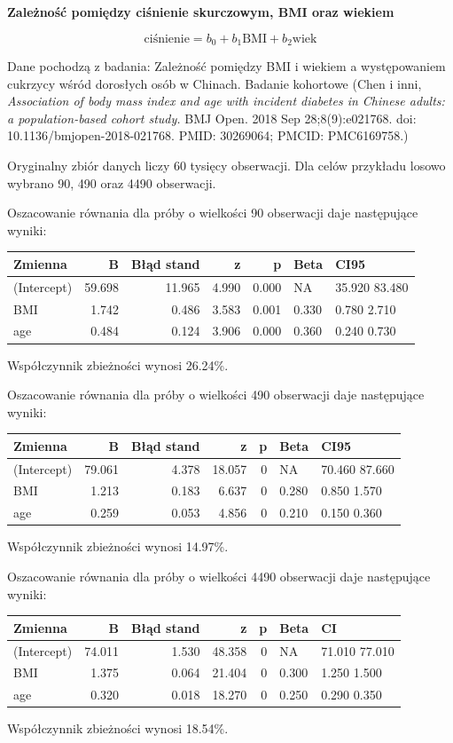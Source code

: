 \documentclass[
  openany]{book}
\begin{document}
\begin{example}
\textbf{Zależność pomiędzy ciśnienie skurczowym, BMI oraz wiekiem}

\[\textrm{ciśnienie} = b_0 + b_1 \textrm{BMI} + b_2\textrm{wiek}\]

Dane pochodzą z badania: Zależność pomiędzy BMI i wiekiem a występowaniem cukrzycy
wśród dorosłych osób w Chinach. Badanie kohortowe (Chen i inni, \emph{Association of body mass index
and age with incident diabetes in Chinese adults: a population-based cohort study.}
BMJ Open. 2018 Sep 28;8(9):e021768. doi: 10.1136/bmjopen-2018-021768. PMID: 30269064; PMCID: PMC6169758.)

Oryginalny zbiór danych liczy 60 tysięcy obserwacji. Dla celów przykładu losowo wybrano 90, 490
oraz 4490 obserwacji.

Oszacowanie równania dla próby o wielkości 90 obserwacji daje następujące wyniki:

\begin{tabular}{l|r|r|r|r|l|l}
\hline
Zmienna & B & Błąd stand & z & p & Beta & CI95\\
\hline
(Intercept) & 59.698 & 11.965 & 4.990 & 0.000 & NA & 35.920 83.480\\
\hline
BMI & 1.742 & 0.486 & 3.583 & 0.001 & 0.330 & 0.780 2.710\\
\hline
age & 0.484 & 0.124 & 3.906 & 0.000 & 0.360 & 0.240 0.730\\
\hline
\end{tabular}

Współczynnik zbieżności wynosi 26.24\%.

Oszacowanie równania dla próby o wielkości 490 obserwacji daje następujące
wyniki:

\begin{tabular}{l|r|r|r|r|l|l}
\hline
Zmienna & B & Błąd stand & z & p & Beta & CI95\\
\hline
(Intercept) & 79.061 & 4.378 & 18.057 & 0 & NA & 70.460 87.660\\
\hline
BMI & 1.213 & 0.183 & 6.637 & 0 & 0.280 & 0.850 1.570\\
\hline
age & 0.259 & 0.053 & 4.856 & 0 & 0.210 & 0.150 0.360\\
\hline
\end{tabular}

Współczynnik zbieżności wynosi 14.97\%.

Oszacowanie równania dla próby o wielkości 4490 obserwacji daje następujące
wyniki:

\begin{tabular}{l|r|r|r|r|l|l}
\hline
Zmienna & B & Błąd stand & z & p & Beta & CI\\
\hline
(Intercept) & 74.011 & 1.530 & 48.358 & 0 & NA & 71.010 77.010\\
\hline
BMI & 1.375 & 0.064 & 21.404 & 0 & 0.300 & 1.250 1.500\\
\hline
age & 0.320 & 0.018 & 18.270 & 0 & 0.250 & 0.290 0.350\\
\hline
\end{tabular}

Współczynnik zbieżności wynosi 18.54\%.
\end{example}
\end{document}
